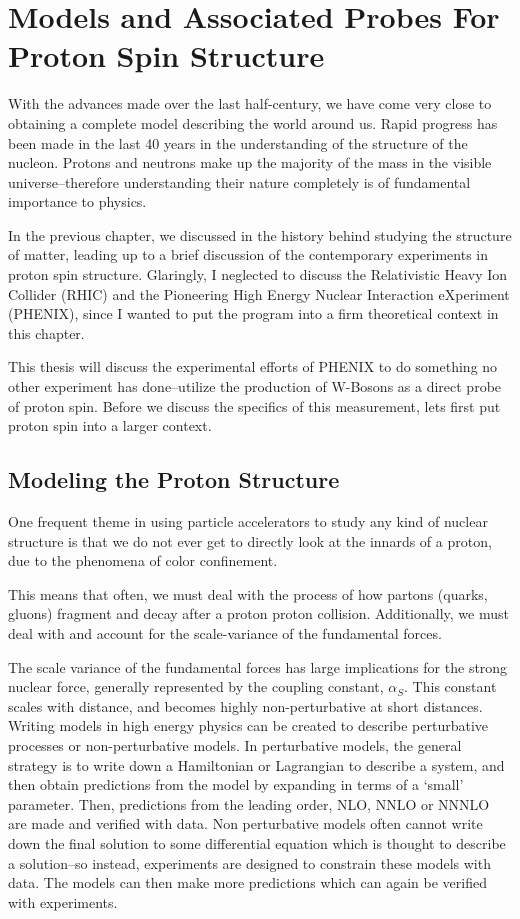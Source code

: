 \chapter{Models and Associated Probes For Proton Spin Structure}
\label{ch:modeling_proton_spin}

With the advances made over the last half-century, we have come very close to
obtaining a complete model describing the world around us.  Rapid progress has
been made in the last 40 years in the understanding of the structure of the
nucleon. Protons and neutrons make up the majority of the mass in the visible
universe--therefore understanding their nature completely is of fundamental
importance to physics.

In the previous chapter, we discussed in the history behind studying the
structure of matter, leading up to a brief discussion of the contemporary
experiments in proton spin structure. Glaringly, I neglected to discuss the
Relativistic Heavy Ion Collider (RHIC) and the Pioneering High Energy Nuclear
Interaction eXperiment (PHENIX), since I wanted to put the program into a firm
theoretical context in this chapter.

This thesis will discuss the experimental efforts of PHENIX to do something no
other experiment has done--utilize the production of W-Bosons as a direct probe
of proton spin. Before we discuss the specifics of this measurement, lets first
put proton spin into a larger context.

\section{Modeling the Proton Structure}

One frequent theme in using particle accelerators to study any kind of nuclear
structure is that we do not ever get to directly look at the innards of a
proton, due to the phenomena of color confinement.

This means that often, we must deal with the process of how partons (quarks,
gluons) fragment and decay after a proton proton collision. Additionally, we
must deal with and account for the scale-variance of the fundamental forces. 

The scale variance of the fundamental forces has large implications for the
strong nuclear force, generally represented by the coupling constant,
$\alpha_S$. This constant scales with distance, and becomes highly
non-perturbative at short distances. Writing models in high energy physics can
be created to describe perturbative processes or non-perturbative models.  In
perturbative models, the general strategy is to write down a Hamiltonian or
Lagrangian to describe a system, and then obtain predictions from the model by
expanding in terms of a `small' parameter. Then, predictions from the leading
order, NLO, NNLO or NNNLO are made and verified with data. Non perturbative
models often cannot write down the final solution to some differential equation
which is thought to describe a solution--so instead, experiments are designed
to constrain these models with data. The models can then make more predictions
which can again be verified with experiments. 

